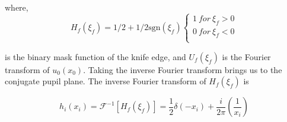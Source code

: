 where,
\[ 
H_f(\xi_f)= 1/2+1/2\mbox{sgn}(\xi_f) \left\{
\begin{array}{ll}
      1 \: for \: \xi_f >0\\
      0 \: for \: \xi_f <0\\
      
\end{array} 
\right. 
\]

is the binary mask function of the knife edge, and $U_f(\xi_f)$ is the Fourier transform of $u_0(x_0)$. Taking the inverse Fourier transform brings us to the conjugate pupil plane. The inverse Fourier transform of $H_f(\xi_f)$ is


\begin{equation}
    h_i(x_i)= \mathcal{F}^{-1}[H_f(\xi_f)] =
    \frac{1}{2} \delta(-x_i) + \frac{i}{2\pi} \left(\frac{1}{x_i}\right)
\label{delta}
\end{equation}





